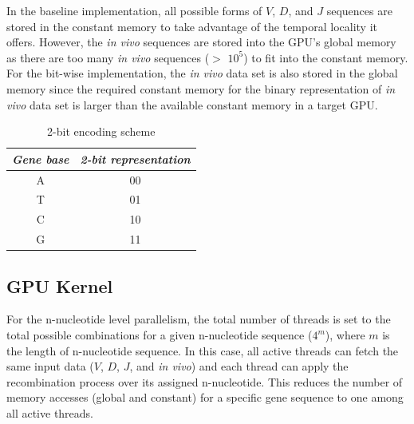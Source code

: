 In the baseline implementation, all possible forms of $V$, $D$, and $J$ sequences are stored in the constant memory to take advantage of the temporal locality it offers. However, the \emph{in vivo} sequences are stored into the GPU's global memory as there are too many \emph{in vivo} sequences ($>$ $10^5$) to fit into the constant memory. For the bit-wise implementation, the \emph{in vivo} data set is also stored in the global memory since the required constant memory for the binary representation of \emph{in vivo} data set is larger than the available constant memory in a target GPU.

\begin{table}[t!]
\caption{2-bit encoding scheme}

\renewcommand{\arraystretch}{1.2}
\begin{center}
\begin{tabular}{ |c|c| }
  \hline
   \textbf{\textit{ Gene base}}  &\textbf{\textit{2-bit representation }}\\	\hline
    A & 00 \\	\hline
    T & 01 \\	\hline
    C & 10 \\	\hline
    G & 11 \\	
  \hline
\end{tabular}

  \label{tab:encode}
\end{center}

\end{table}


\subsection {GPU Kernel}

For the n-nucleotide level parallelism, the total number of threads is set to the total possible combinations for a given n-nucleotide sequence ($4^m$), where $m$ is the length of n-nucleotide sequence. In this case, all active threads can fetch the same input data ($V$, $D$, $J$, and \emph{in vivo}) and each thread can  apply the recombination process over its assigned n-nucleotide. This reduces the number of memory accesses (global and constant) for a specific gene sequence to one among all active threads.


